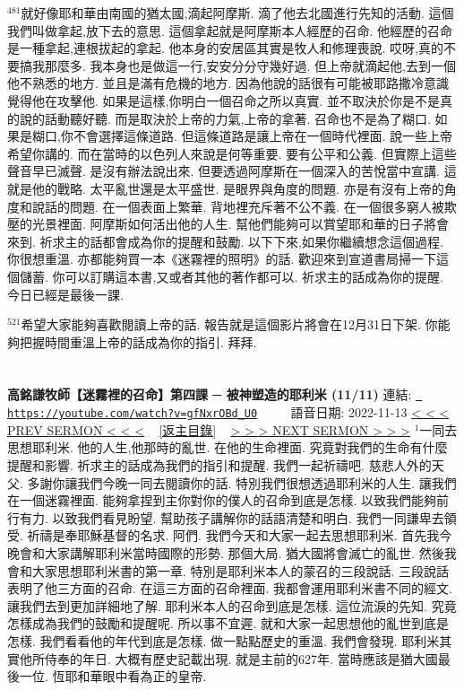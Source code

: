 \documentclass{book}
\begin{document}
$^{481}$就好像耶和華由南國的猶太國,滴起阿摩斯.
滴了他去北國進行先知的活動.
這個我們叫做拿起,放下去的意思.
這個拿起就是阿摩斯本人經歷的召命.
他經歷的召命是一種拿起,連根拔起的拿起.
他本身的安居區其實是牧人和修理喪說.
哎呀,真的不要搞我那麼多.
我本身也是做這一行,安安分分守幾好過.
但上帝就滴起他,去到一個他不熟悉的地方.
並且是滿有危機的地方.
因為他說的話很有可能被耶路撒冷意識覺得他在攻擊他.
如果是這樣,你明白一個召命之所以真實.
並不取決於你是不是真的說的話動聽好聽.
而是取決於上帝的力氣,上帝的拿著.
召命也不是為了糊口.
如果是糊口,你不會選擇這條道路.
但這條道路是讓上帝在一個時代裡面.
說一些上帝希望你講的.
而在當時的以色列人來說是何等重要.
要有公平和公義.
但實際上這些聲音早已滅聲.
是沒有辦法說出來.
但要透過阿摩斯在一個深入的苦悅當中宣講.
這就是他的戰略.
太平亂世還是太平盛世.
是眼界與角度的問題.
亦是有沒有上帝的角度和說話的問題.
在一個表面上繁華.
背地裡充斥著不公不義.
在一個很多窮人被欺壓的光景裡面.
阿摩斯如何活出他的人生.
幫他們能夠可以賞望耶和華的日子將會來到.
祈求主的話都會成為你的提醒和鼓勵.
以下下來,如果你繼續想念這個過程.
你很想重溫.
亦都能夠買一本《迷霧裡的照明》的話.
歡迎來到宣道書局掃一下這個儲蓄.
你可以訂購這本書,又或者其他的著作都可以.
祈求主的話成為你的提醒.
今日已經是最後一課.

$^{521}$希望大家能夠喜歡閱讀上帝的話.
報告就是這個影片將會在12月31日下架.
你能夠把握時間重溫上帝的話成為你的指引.
拜拜.
\newpage



\section{}
\label{sec:gfNxrOBd_U0}
\textbf{高銘謙牧師【迷霧裡的召命】第四課 ─ 被神塑造的耶利米 (11/11)}
\newline
\newline
連結: \href{https://youtube.com/watch?v=gfNxrOBd_U0}{\texttt{ https://youtube.com/watch?v=gfNxrOBd\_U0}} ~~~~ 語音日期: 2022-11-13 
\newline
\newline
\hyperref[sec:P4IZ6PCS8no]{\small{< < < PREV SERMON < < <}}
~
\hyperref[sec:index]{\small{[返主目錄]}}
~
\hyperref[sec:code]{\small{> > > NEXT SERMON > > >}}
\newline
\newline
$^{1}$一同去思想耶利米.
他的人生,他那時的亂世.
在他的生命裡面.
究竟對我們的生命有什麼提醒和影響.
祈求主的話成為我們的指引和提醒.
我們一起祈禱吧.
慈悲人外的天父.
多謝你讓我們今晚一同去閱讀你的話.
特別我們很想透過耶利米的人生.
讓我們在一個迷霧裡面.
能夠拿捏到主你對你的僕人的召命到底是怎樣.
以致我們能夠前行有力.
以致我們看見盼望.
幫助孩子講解你的話語清楚和明白.
我們一同謙卑去領受.
祈禱是奉耶穌基督的名求.
阿們.
我們今天和大家一起去思想耶利米.
首先我今晚會和大家講解耶利米當時國際的形勢.
那個大局.
猶大國將會滅亡的亂世.
然後我會和大家思想耶利米書的第一章.
特別是耶利米本人的蒙召的三段說話.
三段說話表明了他三方面的召命.
在這三方面的召命裡面.
我都會運用耶利米書不同的經文.
讓我們去到更加詳細地了解.
耶利米本人的召命到底是怎樣.
這位流淚的先知.
究竟怎樣成為我們的鼓勵和提醒呢.
所以事不宜遲.
就和大家一起思想他的亂世到底是怎樣.
我們看看他的年代到底是怎樣.
做一點點歷史的重溫.
我們會發現.
耶利米其實他所侍奉的年日.
大概有歷史記載出現.
就是主前的627年.
當時應該是猶大國最後一位.
恆耶和華眼中看為正的皇帝.
\end{document}
